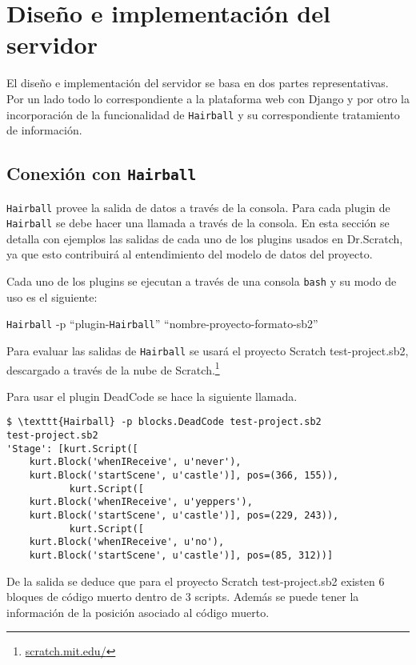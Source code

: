 \documentclass[a4paper, 12pt]{book}
\begin{document}
\section{Diseño e implementación del servidor}
\label{sec:servidor}

El diseño e implementación del servidor se basa en dos partes representativas. Por un lado todo lo
correspondiente a la plataforma web con Django y por otro la incorporación de la funcionalidad de
\texttt{Hairball} y su correspondiente tratamiento de información.

\subsection{Conexión con \texttt{Hairball}}

\texttt{Hairball} provee la salida de datos a través de la consola. Para cada plugin de \texttt{Hairball} se debe hacer una llamada
a través de la consola. En esta sección se detalla con ejemplos las salidas de cada uno de los plugins usados en
Dr.Scratch, ya que esto contribuirá al entendimiento del modelo de datos del proyecto.

Cada uno de los plugins se ejecutan a través de una consola \texttt{bash} y su modo de uso es el siguiente:

\begin{center}
\texttt{Hairball} -p "`plugin-\texttt{Hairball}"' "`nombre-proyecto-formato-sb2"'
\end{center}

Para evaluar las salidas de \texttt{Hairball} se usará el proyecto Scratch test-project.sb2, descargado a través de la 
nube de Scratch.\footnote{\url{scratch.mit.edu/}}

Para usar el plugin DeadCode se hace la siguiente llamada.
\begingroup
\fontsize{7pt}{8pt}\selectfont
\begin{verbatim}
$ \texttt{Hairball} -p blocks.DeadCode test-project.sb2 
test-project.sb2 
'Stage': [kurt.Script([ 
    kurt.Block('whenIReceive', u'never'), 
    kurt.Block('startScene', u'castle')], pos=(366, 155)), 
           kurt.Script([  
    kurt.Block('whenIReceive', u'yeppers'), 
    kurt.Block('startScene', u'castle')], pos=(229, 243)), 
           kurt.Script([ 
    kurt.Block('whenIReceive', u'no'), 
    kurt.Block('startScene', u'castle')], pos=(85, 312))] 
\end{verbatim}
\endgroup

De la salida se deduce que para el proyecto Scratch test-project.sb2 existen 6 bloques de código
muerto dentro de 3 scripts. Además se puede tener la información de la posición asociado al código
muerto. 
\end{document}
